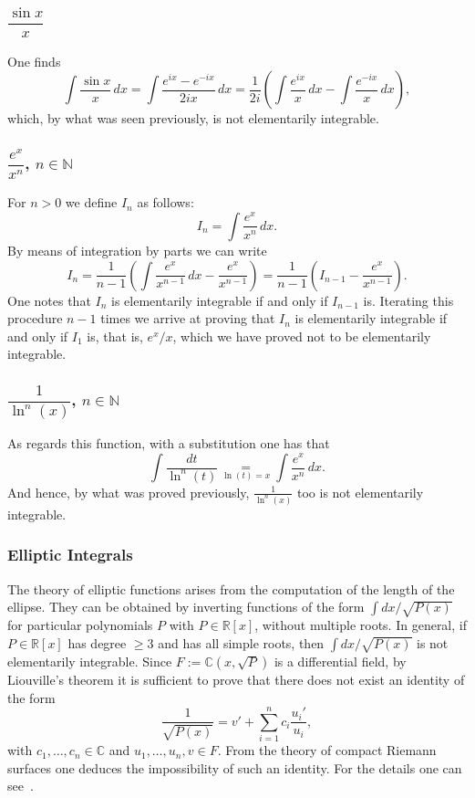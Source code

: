 \documentclass[11pt]{article}
\theoremstyle{plain}
\theoremstyle{definition}
\theoremstyle{remark}
\newcommand{\C}{\mathbb{C}}
\newcommand{\R}{\mathbb{R}}
\newcommand{\N}{\mathbb{N}}
\begin{document}
\subsubsection*{$\dfrac{\sin x}{x}$}
One finds
\[
\int \frac{\sin x}{x}\, dx
= \int \frac{e^{ix} - e^{-ix}}{2ix}\, dx
= \frac{1}{2i}\left( \int \frac{e^{ix}}{x}\, dx
- \int \frac{e^{-ix}}{x}\, dx \right),
\]
which, by what was seen previously, is not elementarily integrable.

\subsubsection*{$\dfrac{e^{x}}{x^{n}}$, $n \in \N$}
For $n > 0$ we define $I_{n}$ as follows:
\[
I_{n} = \int \frac{e^{x}}{x^{n}}\, dx.
\]
By means of integration by parts we can write
\[
I_{n} = \frac{1}{n-1}\left( \int \frac{e^{x}}{x^{n-1}}\, dx
- \frac{e^{x}}{x^{n-1}} \right)
= \frac{1}{n-1}\left( I_{n-1} - \frac{e^{x}}{x^{n-1}} \right).
\]
One notes that $I_{n}$ is elementarily integrable if and only if
$I_{n-1}$ is. Iterating this procedure $n-1$ times we arrive at proving
that $I_{n}$ is elementarily integrable if and only if $I_{1}$ is, that
is, $e^{x}/x$, which we have proved not to be elementarily integrable.

\subsubsection*{$\dfrac{1}{\ln^{n}(x)}$, $n \in \N$}
As regards this function, with a substitution one has that
\[
\int \frac{dt}{\ln^{n}(t)} \underset{\ln(t)=x}{=}
\int \frac{e^{x}}{x^{n}}\, dx.
\]
And hence, by what was proved previously, $\frac{1}{\ln^{n}(x)}$ too is
not elementarily integrable.

\subsubsection*{Elliptic Integrals}
The theory of elliptic functions arises from the computation of the
length of the ellipse. They can be obtained by inverting functions of
the form $\int dx/\sqrt{P(x)}$ for particular polynomials $P$ with
$P \in \R[x]$, without multiple roots. In general, if $P \in \R[x]$ has
degree $\ge 3$ and has all simple roots, then $\int dx/\sqrt{P(x)}$ is
not elementarily integrable. Since $F := \C(x, \sqrt{P})$ is a
differential field, by Liouville's theorem it is sufficient to prove
that there does not exist an identity of the form
\[
\frac{1}{\sqrt{P(x)}} = v' + \sum_{i=1}^{n} c_{i} \frac{u_{i}'}{u_{i}},
\]
with $c_{1}, \ldots, c_{n} \in \C$ and $u_{1}, \ldots, u_{n}, v \in F$.
From the theory of compact Riemann surfaces one deduces the
impossibility of such an identity. For the details one can
see~\cite{Conrad}.
\end{document}

